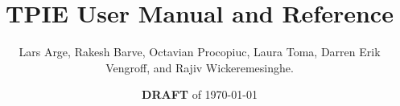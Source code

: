 

\setlength{\topmargin}{-.5in}   
\setlength{\oddsidemargin}{.1in} %
\setlength{\evensidemargin}{.1in} %
\setlength{\textwidth}{6.3in}
\setlength{\textheight}{9in}

\makeindex



\newcommand{\edition}{0.7.1}
\newcommand{\version}{0.7.1a}
\newcommand{\gxxversion}{2.8.0}





\title{TPIE User Manual and Reference}
\author{Lars Arge, Rakesh Barve, Octavian Procopiuc, Laura Toma,
        Darren Erik Vengroff, and Rajiv Wickeremesinghe.}
\date{{\bf DRAFT} of \today}

\maketitle

